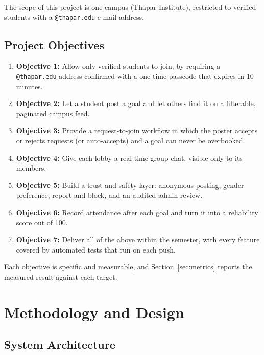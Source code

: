 \documentclass[twoside,12pt]{tietreport}
\begin{document}
The scope of this project is one campus (Thapar Institute), restricted to verified
students with a \texttt{@thapar.edu} e-mail address.

\section{Project Objectives}

\begin{enumerate}
  \item \textbf{Objective 1:} Allow only verified students to join, by requiring a
    \texttt{@thapar.edu} address confirmed with a one-time passcode that expires
    in 10 minutes.
  \item \textbf{Objective 2:} Let a student post a goal and let others find it on a
    filterable, paginated campus feed.
  \item \textbf{Objective 3:} Provide a request-to-join workflow in which the
    poster accepts or rejects requests (or auto-accepts) and a goal can never be
    overbooked.
  \item \textbf{Objective 4:} Give each lobby a real-time group chat, visible only
    to its members.
  \item \textbf{Objective 5:} Build a trust and safety layer: anonymous posting,
    gender preference, report and block, and an audited admin review.
  \item \textbf{Objective 6:} Record attendance after each goal and turn it into a
    reliability score out of 100.
  \item \textbf{Objective 7:} Deliver all of the above within the semester, with
    every feature covered by automated tests that run on each push.
\end{enumerate}

Each objective is specific and measurable, and Section~\ref{sec:metrics} reports
the measured result against each target.

\chapter{Methodology and Design}

\section{System Architecture}
\end{document}
